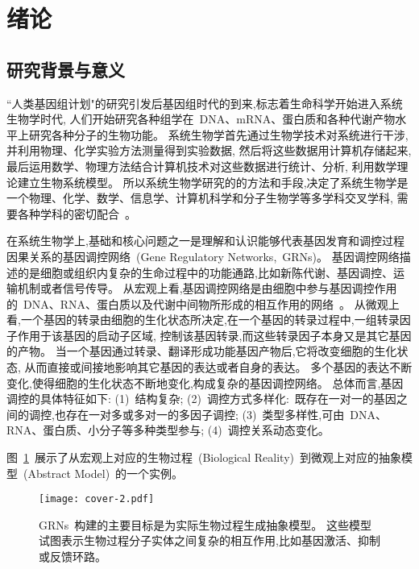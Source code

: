 \section{绪论}
\subsection{研究背景与意义}

``人类基因组计划"的研究引发后基因组时代的到来,标志着生命科学开始进入系统生物学时代,
人们开始研究各种组学在~DNA、mRNA、蛋白质和各种代谢产物水平上研究各种分子的生物功能。
系统生物学首先通过生物学技术对系统进行干涉,并利用物理、化学实验方法测量得到实验数据,
然后将这些数据用计算机存储起来,最后运用数学、物理方法结合计算机技术对这些数据进行统计、分析,
利用数学理论建立生物系统模型。
所以系统生物学研究的的方法和手段,决定了系统生物学是一个物理、化学、数学、信息学、计算机科学和分子生物学等多学科交叉学科,
需要各种学科的密切配合~\cite{ideker2001new}。

在系统生物学上,基础和核心问题之一是理解和认识能够代表基因发育和调控过程因果关系的基因调控网络~(Gene Regulatory Networks,~GRNs)。
基因调控网络描述的是细胞或组织内复杂的生命过程中的功能通路,比如新陈代谢、基因调控、运输机制或者信号传导。
从宏观上看,基因调控网络是由细胞中参与基因调控作用的~DNA、RNA、蛋白质以及代谢中间物所形成的相互作用的网络~\cite{de2002modeling}。
从微观上看,一个基因的转录由细胞的生化状态所决定,在一个基因的转录过程中,一组转录因子作用于该基因的启动子区域,
控制该基因转录,而这些转录因子本身又是其它基因的产物。
当一个基因通过转录、翻译形成功能基因产物后,它将改变细胞的生化状态,
从而直接或间接地影响其它基因的表达或者自身的表达。
多个基因的表达不断变化,使得细胞的生化状态不断地变化,构成复杂的基因调控网络。
总体而言,基因调控的具体特征如下: 
(1)~结构复杂;
(2)~调控方式多样化:~既存在一对一的基因之间的调控,也存在一对多或多对一的多因子调控;
(3)~类型多样性,可由~DNA、RNA、蛋白质、小分子等多种类型参与;
(4)~调控关系动态变化。

图~\ref{cover-2}~展示了从宏观上对应的生物过程~(Biological Reality)~到微观上对应的抽象模型~(Abstract Model)~的一个实例。
\begin{figure}[!htbp]
    \centering
    \texttt{[image: cover-2.pdf]}
    \caption{GRNs~构建的主要目标是为实际生物过程生成抽象模型。
    这些模型试图表示生物过程分子实体之间复杂的相互作用,比如基因激活、抑制或反馈环路。
    }
    \label{cover-2}
\end{figure}

